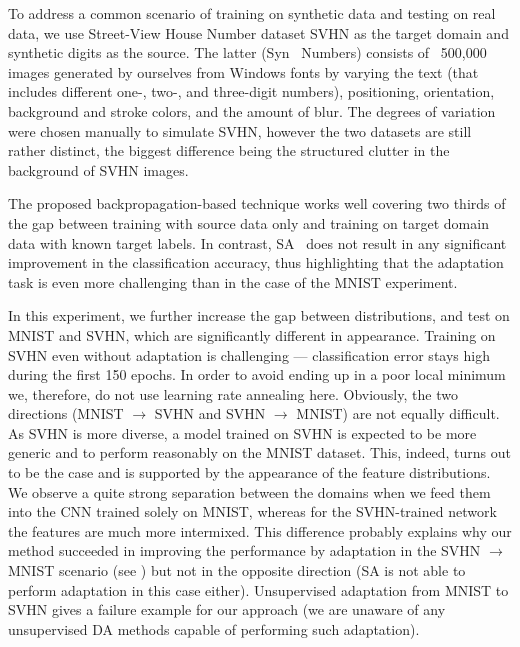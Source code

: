 \vspace{2mm}
To address a common scenario of training on synthetic data and testing on  real data, we use Street-View House Number dataset {\sc SVHN} \cite{Netzer11} as the target domain and synthetic digits as the source. The latter ({\sc Syn ~Numbers}) consists of ~500,000 images generated by ourselves from Windows fonts by varying the text (that includes different one-, two-, and three-digit numbers), positioning, orientation, background and stroke colors, and the amount of blur. The degrees of variation were chosen manually to simulate SVHN, however the two datasets are still rather distinct, the biggest difference being the structured clutter in the background of SVHN images. 

The proposed backpropagation-based technique works well covering two thirds of the gap between training with source data only and training on target domain data with known target labels. In contrast, SA~\cite{Fernando13} does not result in any significant improvement in the classification accuracy, thus highlighting that the adaptation task is even more challenging than in the case of the MNIST experiment.

\vspace{2mm}
In this experiment, we further increase the gap between distributions, and test on {\sc MNIST} and {\sc SVHN}, which are significantly different in appearance. Training on SVHN even without adaptation is challenging --- classification error stays high during the first 150 epochs. In order to avoid ending up in a poor local minimum we, therefore, do not use learning rate annealing here. Obviously, the two directions ({\sc MNIST} $ \rightarrow $ {\sc SVHN} and {\sc SVHN} $ \rightarrow $ {\sc MNIST}) are not equally difficult. As {\sc SVHN} is more diverse, a model trained on SVHN is expected to be more generic and to perform reasonably on the MNIST dataset. This, indeed, turns out to be the case and is supported by the appearance of the feature distributions. We observe a quite strong separation between the domains when we feed them into the CNN trained solely on { \sc MNIST}, whereas for the {\sc SVHN}-trained network the features are much more intermixed. This difference probably explains why our method succeeded in improving the performance by adaptation in the {\sc SVHN} $ \rightarrow $ {\sc MNIST} scenario (see ) but not in the opposite direction (SA is not able to perform adaptation in this case either). Unsupervised adaptation from MNIST to SVHN gives a failure example for our approach (we are unaware of any unsupervised DA methods capable of performing such adaptation).


